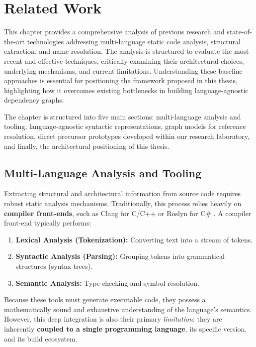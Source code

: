 \chapter{Related Work}
\label{ch:related_work}

This chapter provides a comprehensive analysis of previous research
and state-of-the-art technologies addressing multi-language static
code analysis, structural extraction, and name resolution. The
analysis is structured to evaluate the most recent and effective
techniques, critically examining their architectural choices,
underlying mechanisms, and current limitations. Understanding these
baseline approaches is essential for positioning the framework
proposed in this thesis, highlighting how it overcomes existing
bottlenecks in building language-agnostic dependency graphs.

The chapter is structured into five main sections: multi-language analysis
and tooling, language-agnostic syntactic representations,
graph models for reference resolution, direct precursor prototypes developed
within our research laboratory, and finally, the architectural positioning of
this thesis.

\section{Multi-Language Analysis and Tooling}
\label{sec:multilanguage_challenge}

Extracting structural and architectural information from source code requires
robust static analysis mechanisms. Traditionally, this process relies heavily on
\textbf{compiler front-ends}, such as Clang for C/C++ or Roslyn for
C\# \cite{lattner_llvm_2004}. A compiler front-end typically performs:
\begin{enumerate}
  \item \textbf{Lexical Analysis (Tokenization):} Converting text into a
    stream of tokens.
  \item \textbf{Syntactic Analysis (Parsing):} Grouping tokens into
    grammatical structures (syntax trees).
  \item \textbf{Semantic Analysis:} Type checking and symbol resolution.
\end{enumerate}

Because these tools must generate executable code, they possess a
mathematically sound and exhaustive understanding of the language's
semantics. However, this deep integration is also their primary
\textit{limitation}: they are inherently \textbf{coupled to a single
programming language}, its specific version, and its build ecosystem.


